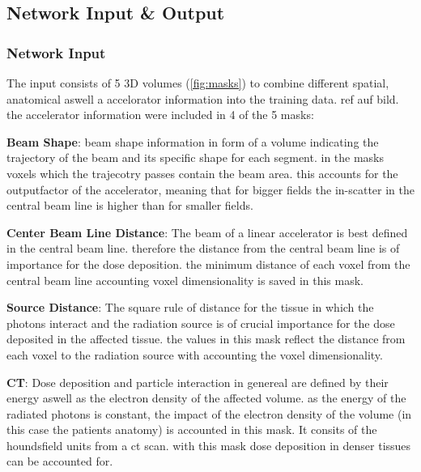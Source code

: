 \subsection{Network Input \& Output}



\subsubsection{Network Input}

The input consists of 5 3D volumes (\autoref{fig:masks}) to combine different spatial, anatomical aswell a accelorator information into the training data. ref auf bild. the accelerator information were included in 4 of the 5 masks:

\setlength{\hangingindent}{1em}
\begin{hangingpar}
    \item \textbf{Beam Shape}: beam shape information in form of a volume indicating the trajectory of the beam and its specific shape for each segment. in the masks voxels which the trajecotry passes contain the beam area. this accounts for the outputfactor of the accelerator, meaning that for bigger fields the in-scatter in the central beam line is higher than for smaller fields. 
\end{hangingpar}
\begin{hangingpar}
    \item \textbf{Center Beam Line Distance}: The beam of a linear accelerator is best defined in the central beam line. therefore the distance from the central beam line is of importance for the dose deposition. the minimum distance of each voxel from the central beam line accounting voxel dimensionality is saved in this mask.
\end{hangingpar}
\begin{hangingpar}
    \item \textbf{Source Distance}: The square rule of distance for the tissue in which the photons interact and the radiation source is of crucial importance for the dose deposited in the affected tissue. the values in this mask reflect the distance from each voxel to the radiation source with accounting the voxel dimensionality. 
\end{hangingpar}
\begin{hangingpar}
    \item \textbf{CT}: Dose deposition and particle interaction in genereal are defined by their energy aswell as the electron density of the affected volume. as the energy of the radiated photons is constant, the impact of the electron density of the volume (in this case the patients anatomy) is accounted in this mask. It consits of the houndsfield units from a ct scan. with this mask dose deposition in denser tissues can be accounted for.
\end{hangingpar}
